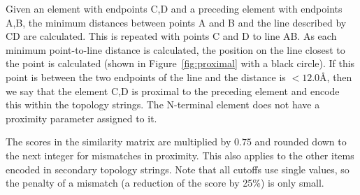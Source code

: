 \documentclass{article}
\begin{document}
Given an element with endpoints C,D and a preceding element with
endpoints A,B, the minimum distances between points A and B and the
line described by CD are calculated.  This is repeated with points C
and D to line AB. As each minimum point-to-line distance is
calculated, the position on the line closest to the point is
calculated (shown in Figure~\ref{fig:proximal} with a black
circle). If this point is between the two endpoints of the line and
the distance is $<12.0$\AA, then we say that the element C,D is
proximal to the preceding element and encode this within the topology
strings. The N-terminal element does not have a proximity parameter
assigned to it.


The scores in the similarity matrix are multiplied by $0.75$ and
rounded down to the next integer for mismatches in proximity. This also
applies to the other items encoded in secondary topology strings. Note
that all cutoffs use single values, so the penalty of a mismatch (a
reduction of the score by 25\%) is only small.


\end{document}
